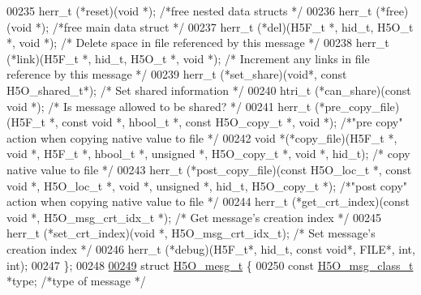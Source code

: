 \begin{DoxyCode}
00235     herr\_t  (*reset)(\textcolor{keywordtype}{void} *);       \textcolor{comment}{/*free nested data structs  */}
00236     herr\_t  (*free)(\textcolor{keywordtype}{void} *);        \textcolor{comment}{/*free main data struct  */}
00237     herr\_t  (*del)(H5F\_t *, hid\_t, H5O\_t *, \textcolor{keywordtype}{void} *);    \textcolor{comment}{/* Delete space in file referenced by this message 
      */}
00238     herr\_t  (*link)(H5F\_t *, hid\_t, H5O\_t *, \textcolor{keywordtype}{void} *);   \textcolor{comment}{/* Increment any links in file reference by this
       message */}
00239     herr\_t  (*set\_share)(\textcolor{keywordtype}{void}*, \textcolor{keyword}{const} H5O\_shared\_t*);   \textcolor{comment}{/* Set shared information */}
00240     htri\_t  (*can\_share)(\textcolor{keyword}{const} \textcolor{keywordtype}{void} *); \textcolor{comment}{/* Is message allowed to be shared? */}
00241     herr\_t  (*pre\_copy\_file)(H5F\_t *, \textcolor{keyword}{const} \textcolor{keywordtype}{void} *, hbool\_t *, \textcolor{keyword}{const} H5O\_copy\_t *, \textcolor{keywordtype}{void} *); \textcolor{comment}{/*"pre copy"
       action when copying native value to file */}
00242     \textcolor{keywordtype}{void}    *(*copy\_file)(H5F\_t *, \textcolor{keywordtype}{void} *, H5F\_t *, hbool\_t *, \textcolor{keywordtype}{unsigned} *, H5O\_copy\_t *, \textcolor{keywordtype}{void} *, hid\_t); \textcolor{comment}{/*
      copy native value to file */}
00243     herr\_t  (*post\_copy\_file)(\textcolor{keyword}{const} H5O\_loc\_t *, \textcolor{keyword}{const} \textcolor{keywordtype}{void} *, H5O\_loc\_t *, \textcolor{keywordtype}{void} *, \textcolor{keywordtype}{unsigned} *, hid\_t, 
      H5O\_copy\_t *); \textcolor{comment}{/*"post copy" action when copying native value to file */}
00244     herr\_t      (*get\_crt\_index)(\textcolor{keyword}{const} \textcolor{keywordtype}{void} *, H5O\_msg\_crt\_idx\_t *);    \textcolor{comment}{/* Get message's creation index */}
00245     herr\_t      (*set\_crt\_index)(\textcolor{keywordtype}{void} *, H5O\_msg\_crt\_idx\_t);    \textcolor{comment}{/* Set message's creation index */}
00246     herr\_t  (*debug)(H5F\_t*, hid\_t, \textcolor{keyword}{const} \textcolor{keywordtype}{void}*, FILE*, int, int);
00247 \};
00248 
\hyperlink{struct_h5_o__mesg__t}{00249} \textcolor{keyword}{struct }\hyperlink{struct_h5_o__mesg__t}{H5O\_mesg\_t} \{
00250     \textcolor{keyword}{const} \hyperlink{struct_h5_o__msg__class__t}{H5O\_msg\_class\_t}    *type;  \textcolor{comment}{/*type of message            */}

\end{DoxyCode}
